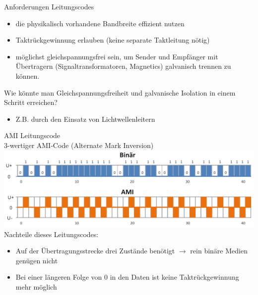 \begin{theorem}{Anforderungen Leitungscodes}
\begin{itemize}
    \item die physikalisch vorhandene Bandbreite effizient nutzen
    \item Taktrückgewinnung erlauben (keine separate Taktleitung nötig)
    \item möglichst gleichspannungsfrei sein, um Sender und Empfänger mit Übertragern (Signaltransformatoren, Magnetics) galvanisch trennen zu können.
\end{itemize} 
\end{theorem}

\begin{example}
    Wie könnte man Gleichspannungsfreiheit und galvanische Isolation in einem Schritt erreichen?
    \begin{itemize}
        \item Z.B. durch den Einsatz von Lichtwellenleitern
    \end{itemize}
\end{example}

\begin{concept}{AMI Leitungscode}\\
    3-wertiger AMI-Code (Alternate Mark Inversion)\\
    \includegraphics[width=0.8\linewidth]{images/gleichspannungsfreiheit.png}\\
    Nachteile dieses Leitungscodes:
    \begin{itemize}
        \item Auf der Übertragungsstrecke drei Zustände benötigt $\rightarrow$ rein binäre Medien genügen nicht
        \item Bei einer längeren Folge von 0 in den Daten ist keine Taktrückgewinnung mehr möglich
    \end{itemize}
\end{concept}

